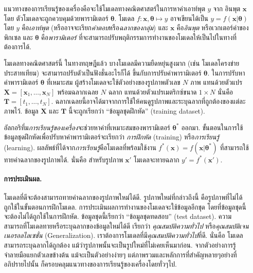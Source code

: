 แนวทางของการเรียนรู้ของเครื่องคือจะใช้โมเดลทางคณิตศาสตร์ในการหาค่าเอาท์พุต $y$ จาก อินพุต $\mathbf{x}$ โดย ตัวโมเดลจะถูกควบคุมด้วยพารามิเตอร์ $\bm{\theta}$.
โมเดล $f:\mathbf{x},\bm{\theta} \mapsto y$ อาจเขียนได้เป็น $y = f(\mathbf{x}|\bm{\theta})$ โดย 
$y$ คือ\textit{เอาท์พุต} (หรืออาจจะเรียก\textit{คำตอบ}หรือ\textit{ฉลากของกลุ่ม})
และ $\mathbf{x}$ คือ\textit{อินพุต} หรือเวกเตอร์ค่าของพิกเซล
และ $\bm{\theta}$ คือ\textit{พารามิเตอร์}%
ที่จะสามารถปรับพฤติกรรมการทำงานของโมเดลให้เป็นไปในทางที่ต้องการได้.

โมเดลทางคณิตศาสตร์นี้  
ในทางทฤษฎีแล้ว 
บางโมเดลมีความยืดหยุ่นสูงมาก (เช่น โมเดลโครงข่ายประสาทเทียม) จะสามารถปรับตัวเป็นฟังชั่นอะไรก็ได้ ขึ้นกับการปรับค่าพารามิเตอร์ $\bm{\theta}$.
%
ในการปรับหาค่าพารามิเตอร์ $\bm{\theta}$ ที่เหมาะสม ผู้สร้างโมเดลจะใช้ตัวอย่างของรูปภาพตัวเลข $N$ ภาพ แทนด้วยตัวแปร $\mathbf{X} = [\mathbf{x}_1, \ldots, \mathbf{x}_N]$ พร้อมฉลากเฉลย $N$ ฉลาก แทนด้วยตัวแปรเมตริกซ์ขนาด $1 \times N$ นั่นคือ $\mathbf{T} =[t_1, \ldots, t_N]$.
ฉลากเฉลยนี้อาจได้มาจากการใช้ให้คนดูรูปภาพและระบุฉลากที่ถูกต้องของแต่ละภาพไว้.
ข้อมูล $\mathbf{X}$ และ $\mathbf{T}$ นี้จะถูกเรียกว่า ``ข้อมูลชุดฝึกหัด'' (training dataset).


อัลกอริทึ่ม\textit{การเรียนรู้ของเครื่อง}จะช่วยหาค่าที่เหมาะสมของพารามิเตอร์ $\bm{\theta}^*$ ออกมา.
ขั้นตอนในการใช้ข้อมูลชุดฝึกหัดเพื่อปรับหาค่าพารามิเตอร์จะเรียกว่า \textit{การฝึกหัด} (training) 
หรือ\textit{การเรียนรู้} (learning).
ผลลัพธ์ที่ได้จาก\textit{การเรียนรู้}คือโมเดลที่พร้อมใช้งาน $f^*(\mathbf{x}) = f(\mathbf{x}|\bm{\theta}^*)$ ที่สามารถใช้ทายค่าฉลากของรูปภาพได้.
นั่นคือ สำหรับรูปภาพ $\mathbf{x}'$ โมเดลจะทายฉลาก $y' = f^*(\mathbf{x}')$.

\paragraph{การประเมินผล.} 
โมเดลที่ดีจะต้องสามารถทายค่าฉลากของรูปภาพใหม่ได้ดี.
รูปภาพใหม่ที่กล่าวถึงนี้ คือรูปภาพที่ไม่ได้ถูกใช้ในขั้นตอนการฝึกโมเดล.
การประเมินผลการทำงานของโมเดลจะใช้ข้อมูลอีกชุด 
โดยที่ข้อมูลชุดนี้จะต้องไม่ได้ถูกใช้ในการฝึกหัด.
ข้อมูลชุดนี้เรียกว่า ``ข้อมูลชุดทดสอบ'' (test dataset).
ความสามารถที่โมเดลทายหรือระบุฉลากของข้อมูลใหม่ได้ดี เรียกว่า \textit{คุณสมบัติความทั่วไป} 
หรือ\textit{คุณสมบัติเจนเนอรอลไลเซชั่น} (Generalization).
เราต้องการโมเดลที่มี\textit{คุณสมบัติความทั่วไป}ที่ดี.
นั่นคือ โมเดลสามารถระบุฉลากได้ถูกต้อง แม้ว่ารูปภาพนั้นจะเป็นรูปใหม่ที่ไม่เคยเห็นมาก่อน.
%
จากตัวอย่างการรู้จำลายมือแยกตัวเลขข้างต้น แม้จะเป็นตัวอย่างง่ายๆ
แต่ภาพรวมและหลักการที่สำคัญหลายๆอย่างที่อภิปรายไปนั้น 
ก็ครอบคลุมแนวทางของการเรียนรู้ของเครื่องโดยทั่วๆไป.

